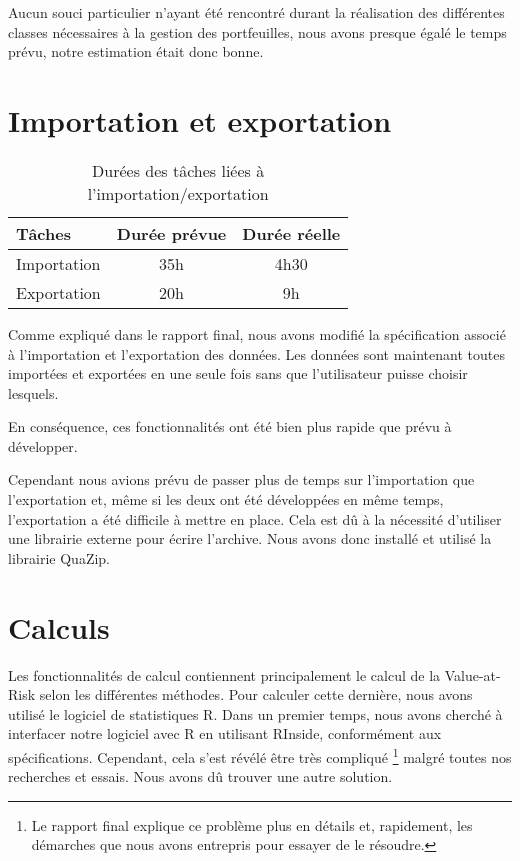 \documentclass[a4paper]{report}
\begin{document}
Aucun souci particulier n'ayant été rencontré durant la réalisation des différentes classes nécessaires à la gestion des portfeuilles, nous avons presque égalé le temps prévu, notre estimation était donc bonne.

\section{Importation et exportation}

\begin{table}[H]
\centering
  \begin{tabularx}{0.8\textwidth}{| X | c | c |}
    \hline
	Tâches & Durée prévue & Durée réelle \\
    \hline
     Importation &  35h & 4h30\\
     Exportation &  20h & 9h\\
    \hline
  \end{tabularx}
  \caption{Durées des tâches liées à l'importation/exportation}
\end{table}

Comme expliqué dans le rapport final, nous avons modifié la spécification associé à l'importation et l'exportation des données.
Les données sont maintenant toutes importées et exportées en une seule fois sans que l'utilisateur puisse choisir lesquels.

En conséquence, ces fonctionnalités ont été bien plus rapide que prévu à développer.

Cependant nous avions prévu de passer plus de temps sur l'importation que l'exportation et, même si les deux ont été développées en même temps, l'exportation a été difficile à mettre en place.
Cela est dû à la nécessité d'utiliser une librairie externe pour écrire l'archive.
Nous avons donc installé et utilisé la librairie QuaZip.


\section{Calculs}

Les fonctionnalités de calcul contiennent principalement le calcul de la Value-at-Risk selon les différentes méthodes.
Pour calculer cette dernière, nous avons utilisé le logiciel de statistiques R.
Dans un premier temps, nous avons cherché à interfacer notre logiciel avec R en utilisant RInside, conformément aux spécifications.
Cependant, cela s'est révélé être très compliqué \footnote{Le rapport final explique ce problème plus en détails et, rapidement, les démarches que nous avons entrepris pour essayer de le résoudre.} malgré toutes nos recherches et essais.
Nous avons dû trouver une autre solution.
\end{document}
